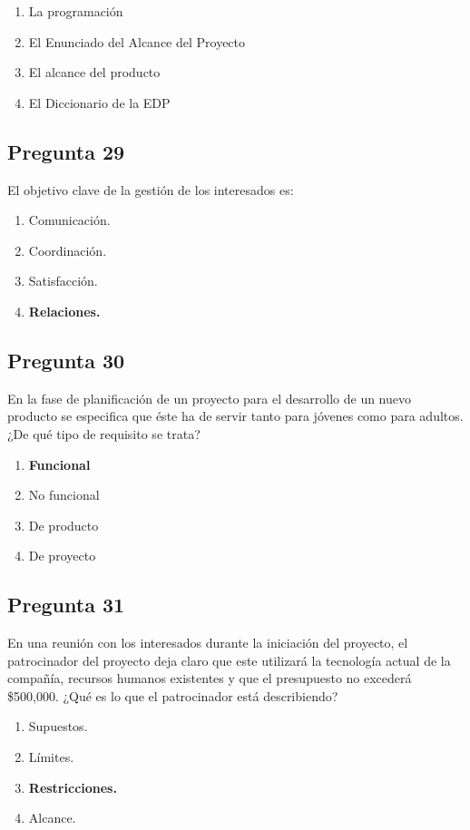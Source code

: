 \documentclass[11pt,a4paper]{article}
\begin{document}
\begin{enumerate}[label=\alph*)]
  \item La programación
  \item El Enunciado del Alcance del Proyecto
  \item El alcance del producto
  \item El Diccionario de la EDP
\end{enumerate}

\subsection*{Pregunta 29}
El objetivo clave de la gestión de los interesados es:

\begin{enumerate}[label=\alph*)]
  \item Comunicación.
  \item Coordinación.
  \item Satisfacción.
  \item \textbf{Relaciones.}
\end{enumerate}

\subsection*{Pregunta 30}
En la fase de planificación de un proyecto para el desarrollo de un nuevo producto se especifica que éste ha de servir tanto para jóvenes como para adultos. ¿De qué tipo de requisito se trata?

\begin{enumerate}[label=\alph*)]
  \item \textbf{Funcional}
  \item No funcional
  \item De producto
  \item De proyecto
\end{enumerate}

\subsection*{Pregunta 31}
En una reunión con los interesados durante la iniciación del proyecto, el patrocinador del proyecto deja claro que este utilizará la tecnología actual de la compañía, recursos humanos existentes y que el presupuesto no excederá \$500,000. ¿Qué es lo que el patrocinador está describiendo?

\begin{enumerate}[label=\alph*)]
  \item Supuestos.
  \item Límites.
  \item \textbf{Restricciones.}
  \item Alcance.
\end{enumerate}
\end{document}
